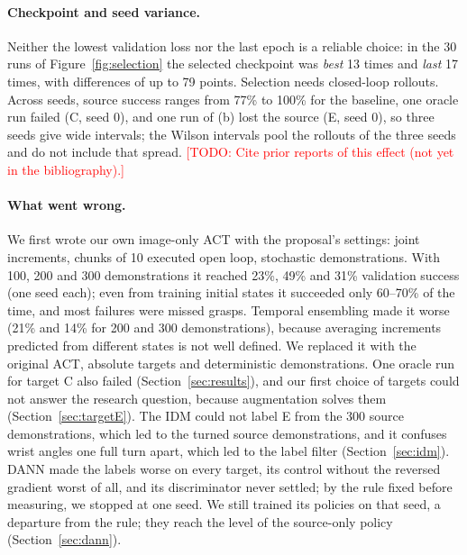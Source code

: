 \documentclass{article}
\newcommand{\todo}[1]{\textcolor{red}{[TODO: #1]}}
\begin{document}
\paragraph{Checkpoint and seed variance.}
Neither the lowest validation loss nor the last epoch is a reliable choice: in the 30
runs of Figure~\ref{fig:selection} the selected checkpoint was \emph{best} 13 times and
\emph{last} 17 times, with differences of up to 79 points. Selection needs closed-loop rollouts.
Across seeds, source success ranges from 77\% to 100\% for the baseline, one oracle run
failed (C, seed 0), and one run of (b) lost the source (E, seed 0), so three seeds give
wide intervals; the Wilson intervals pool the rollouts of
the three seeds and do not include that spread. \todo{Cite prior reports of this effect (not yet in the
bibliography).}

\paragraph{What went wrong.}
\label{sec:whatwentwrong}
We first wrote our own image-only ACT with the proposal's settings: joint increments,
chunks of 10 executed open loop, stochastic demonstrations. With 100, 200 and 300
demonstrations it reached 23\%, 49\% and 31\% validation success (one seed each); even
from training initial states it succeeded only 60--70\% of the time, and most failures
were missed grasps. Temporal ensembling made it worse (21\% and 14\% for 200 and 300
demonstrations), because averaging increments predicted from different states is not
well defined. We replaced it with the original ACT, absolute targets and deterministic
demonstrations. One oracle run for target C also failed (Section~\ref{sec:results}), and
our first choice of targets could not answer the research question, because
augmentation solves them (Section~\ref{sec:targetE}). The IDM could not label E from the
300 source demonstrations, which led to the turned source demonstrations, and it
confuses wrist angles one full turn apart, which led to the label filter
(Section~\ref{sec:idm}). DANN made the labels worse on every target, its control without
the reversed gradient worst of all, and its discriminator never settled; by the rule fixed
before measuring, we stopped at one seed. We still trained its policies on that seed, a
departure from the rule; they reach the level of the source-only policy
(Section~\ref{sec:dann}).
\end{document}
